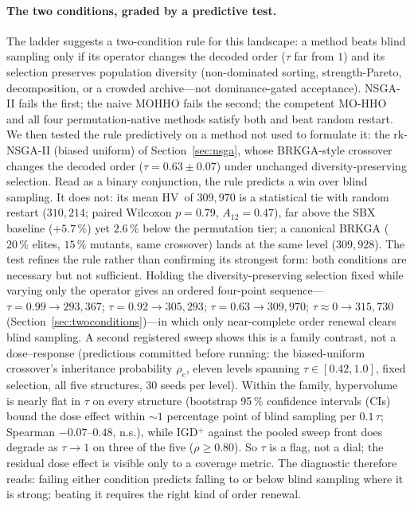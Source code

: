 \documentclass[runningheads]{llncs}
\newcommand{\HV}{\textsf{HV}}
\begin{document}
\paragraph{The two conditions, graded by a predictive test.}
The ladder suggests a two-condition rule for this landscape: a method beats blind sampling only if its operator changes the decoded order ($\tau$ far from $1$) and its selection preserves population diversity (non-dominated sorting, strength-Pareto, decomposition, or a crowded archive---not dominance-gated acceptance). NSGA-II fails the first; the naive MOHHO fails the second; the competent MO-HHO and all four permutation-native methods satisfy both and beat random restart. We then tested the rule predictively on a method not used to formulate it: the rk-NSGA-II (biased uniform) of Section~\ref{sec:nsga}, whose BRKGA-style crossover changes the decoded order ($\tau=0.63\pm0.07$) under unchanged diversity-preserving selection. Read as a binary conjunction, the rule predicts a win over blind sampling. It does not: its mean \HV\ of $309{,}970$ is a statistical tie with random restart ($310{,}214$; paired Wilcoxon $p=0.79$, $A_{12}=0.47$), far above the SBX baseline ($+5.7\,\%$) yet $2.6\,\%$ below the permutation tier; a canonical BRKGA ($20\,\%$ elites, $15\,\%$ mutants, same crossover) lands at the same level ($309{,}928$). The test refines the rule rather than confirming its strongest form: both conditions are necessary but not sufficient. Holding the diversity-preserving selection fixed while varying only the operator gives an ordered four-point sequence---$\tau{=}0.99\!\to\!293{,}367$; $\tau{=}0.92\!\to\!305{,}293$; $\tau{=}0.63\!\to\!309{,}970$; $\tau{\approx}0\!\to\!315{,}730$ (Section~\ref{sec:twoconditions})---in which only near-complete order renewal clears blind sampling. A second registered sweep shows this is a family contrast, not a dose--response (predictions committed before running: the biased-uniform crossover's inheritance probability $\rho_e$, eleven levels spanning $\tau\in[0.42,1.0]$, fixed selection, all five structures, 30 seeds per level). Within the family, hypervolume is nearly flat in $\tau$ on every structure (bootstrap 95\,\% confidence intervals (CIs) bound the dose effect within ${\sim}1$ percentage point of blind sampling per $0.1\,\tau$; Spearman $-0.07$--$0.48$, n.s.), while IGD$^{+}$ against the pooled sweep front does degrade as $\tau\to1$ on three of the five ($\rho\ge0.80$). So $\tau$ is a flag, not a dial; the residual dose effect is visible only to a coverage metric. The diagnostic therefore reads: failing either condition predicts falling to or below blind sampling where it is strong; beating it requires the right kind of order renewal.
\end{document}
